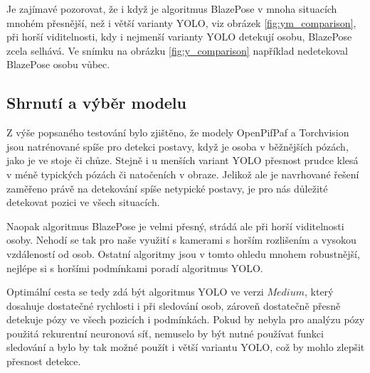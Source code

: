 Je zajímavé pozorovat, že i když je algoritmus BlazePose v mnoha situacích
mnohém přesnější, než i větší varianty YOLO, viz obrázek
\ref{fig:ym_comparison}, při horší viditelnosti, kdy i nejmenší varianty YOLO
detekují osobu, BlazePose zcela selhává. Ve snímku na obrázku
\ref{fig:y_comparison} například nedetekoval BlazePose osobu vůbec.

\subsection{Shrnutí a výběr modelu}

Z výše popsaného testování bylo zjištěno, že modely OpenPifPaf a Torchvision
jsou natrénované spíše pro detekci postavy, když je osoba v běžnějších pózách,
jako je ve stoje či chůze. Stejně i u menších variant YOLO přesnost prudce
klesá v méně typických pózách či natočeních v obraze. Jelikož ale je navrhované
řešení zaměřeno právě na detekování spíše netypické postavy, je pro nás
důležité detekovat pozici ve všech situacích.

Naopak algoritmus BlazePose je velmi přesný, strádá ale při horší viditelnosti
osoby. Nehodí se tak pro naše využití s kamerami s horším rozlišením a vysokou
vzdáleností od osob. Ostatní algoritmy jsou v tomto ohledu mnohem robustnější,
nejlépe si s horšími podmínkami poradí algoritmus YOLO.

Optimální cesta se tedy zdá být algoritmus YOLO ve verzi $Medium$, který
dosahuje dostatečné rychlosti i při sledování osob, zároveň dostatečně přesně
detekuje pózy ve všech pozicích i podmínkách. Pokud by nebyla pro analýzu pózy
použitá rekurentní neuronová síť, nemuselo by být nutné používat funkci
sledování a bylo by tak možné použít i větší variantu YOLO, což by mohlo
zlepšit přesnost detekce.

\endinput